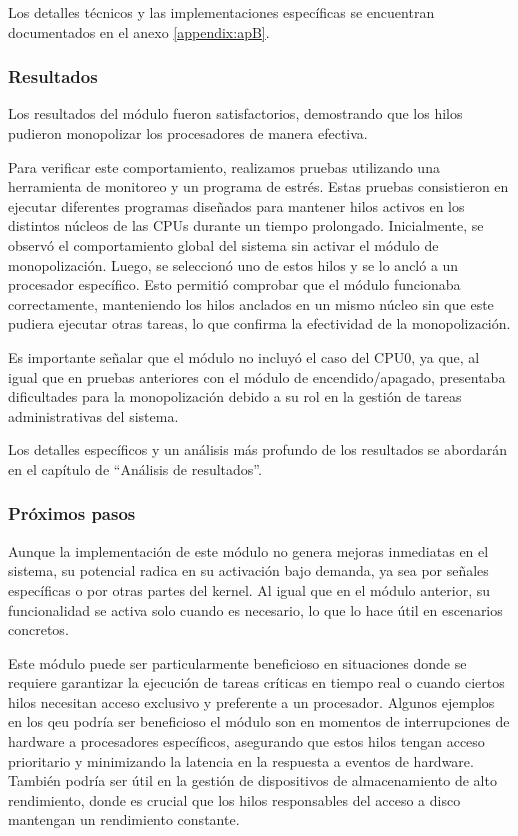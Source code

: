 Los detalles técnicos y las implementaciones específicas se encuentran documentados en el anexo \ref{appendix:apB}.

\subsubsection{Resultados}

Los resultados del módulo fueron satisfactorios, demostrando que los hilos pudieron monopolizar los procesadores de manera efectiva.\par

Para verificar este comportamiento, realizamos pruebas utilizando una herramienta de monitoreo y un programa de estrés. Estas pruebas consistieron en ejecutar diferentes programas diseñados para mantener hilos activos en los distintos núcleos de las CPUs durante un tiempo prolongado. Inicialmente, se observó el comportamiento global del sistema sin activar el módulo de monopolización. Luego, se seleccionó uno de estos hilos y se lo ancló a un procesador específico. Esto permitió comprobar que el módulo funcionaba correctamente, manteniendo los hilos anclados en un mismo núcleo sin que este pudiera ejecutar otras tareas, lo que confirma la efectividad de la monopolización.\par

Es importante señalar que el módulo no incluyó el caso del CPU0, ya que, al igual que en pruebas anteriores con el módulo de encendido/apagado, presentaba dificultades para la monopolización debido a su rol en la gestión de tareas administrativas del sistema.\par

Los detalles específicos y un análisis más profundo de los resultados se abordarán en el capítulo de “Análisis de resultados”.\par

\subsubsection{Próximos pasos}

Aunque la implementación de este módulo no genera mejoras inmediatas en el sistema, su potencial radica en su activación bajo demanda, ya sea por señales específicas o por otras partes del kernel. Al igual que en el módulo anterior, su funcionalidad se activa solo cuando es necesario, lo que lo hace útil en escenarios concretos.

Este módulo puede ser particularmente beneficioso en situaciones donde se requiere garantizar la ejecución de tareas críticas en tiempo real o cuando ciertos hilos necesitan acceso exclusivo y preferente a un procesador. Algunos ejemplos en los qeu podría ser beneficioso el módulo son en momentos de interrupciones de hardware a procesadores específicos, asegurando que estos hilos tengan acceso prioritario y minimizando la latencia en la respuesta a eventos de hardware. También podría ser útil en la gestión de dispositivos de almacenamiento de alto rendimiento, donde es crucial que los hilos responsables del acceso a disco mantengan un rendimiento constante.

